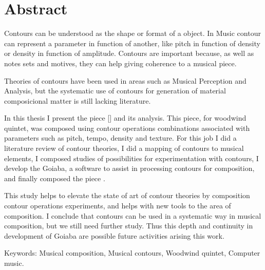 \chapter*{Abstract}
\label{cha:abstract}

Contours can be understood as the shape or format of a object. In
Music contour can represent a parameter in function of another, like
pitch in function of density or density in function of
amplitude. Contours are important because, as well as notes sets and
motives, they can help giving coherence to a musical piece.

Theories of contours have been used in areas such as Musical
Perception and Analysis, but the systematic use of contours for
generation of material composicional matter is still lacking
literature.

In this thesis I present the piece \obra{} [] and its analysis. This piece, for woodwind quintet,
was composed using contour operations combinations associated with
parameters such as pitch, tempo, density and texture. For this job I
did a literature review of contour theories, I did a mapping of
contours to musical elements, I composed studies of possibilities for
experimentation with contours, I develop the Goiaba, a software to
assist in processing contours for composition, and finally composed
the piece \obra{}.

This study helps to elevate the state of art of contour theories by
composition contour operations experiments, and helps with new tools
to the area of composition.
I conclude that contours can be used in a systematic way in musical
composition, but we still need further study. Thus this depth and
continuity in development of Goiaba are possible future activities
arising this work.

Keywords: Musical composition, Musical contours, Woodwind quintet,
Computer music.
